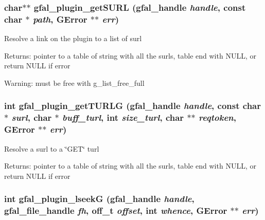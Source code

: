 \subsubsection{\setlength{\rightskip}{0pt plus 5cm}char$\ast$$\ast$ gfal\_\-plugin\_\-get\-SURL (gfal\_\-handle {\em handle}, const char $\ast$ {\em path}, GError $\ast$$\ast$ {\em err})}\label{gfal__common__plugin_8c_79e889a6f6f6297772952d69cdfceff7}


Resolve a link on the plugin to a list of surl \begin{Desc}
\item[Returns:]pointer to a table of string with all the surls, table end with NULL, or return NULL if error \end{Desc}
\begin{Desc}
\item[Warning:]must be free with g\_\-list\_\-free\_\-full \end{Desc}
\subsubsection{\setlength{\rightskip}{0pt plus 5cm}int gfal\_\-plugin\_\-get\-TURLG (gfal\_\-handle {\em handle}, const char $\ast$ {\em surl}, char $\ast$ {\em buff\_\-turl}, int {\em size\_\-turl}, char $\ast$$\ast$ {\em reqtoken}, GError $\ast$$\ast$ {\em err})}\label{gfal__common__plugin_8c_acf838514b0862d12fbfeab576959c1e}


Resolve a surl to a \char`\"{}GET\char`\"{} turl \begin{Desc}
\item[Returns:]pointer to a table of string with all the surls, table end with NULL, or return NULL if error \end{Desc}
\subsubsection{\setlength{\rightskip}{0pt plus 5cm}int gfal\_\-plugin\_\-lseek\-G (gfal\_\-handle {\em handle}, gfal\_\-file\_\-handle {\em fh}, off\_\-t {\em offset}, int {\em whence}, GError $\ast$$\ast$ {\em err})}\label{gfal__common__plugin_8c_c29b06ae43aa86049b513d1174393019}


